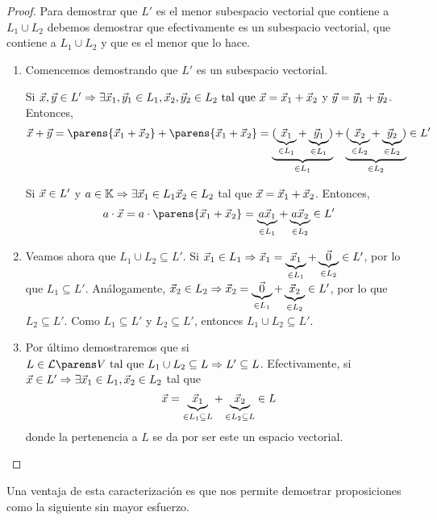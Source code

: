 \documentclass[../algebra_lineal.tex]{subfiles}
\begin{document}
\begin{proof}
    Para demostrar que $L'$ es el menor subespacio vectorial que contiene a $L_1 \cup L_2$ debemos demostrar que efectivamente es un subespacio vectorial, que contiene a $L_1 \cup L_2$ y que es el menor que lo hace.

    \begin{enumerate}
        \item Comencemos demostrando que $L'$ es un subespacio vectorial.

        Si $\vec{x}, \vec{y} \in L' \Rightarrow \exists \vec{x}_1, \vec{y}_1 \in L_1, \vec{x}_2, \vec{y}_2 \in L_2 \mathrm{\,\, tal \,\, que \,\,} \vec{x} = \vec{x}_1 + \vec{x}_2$ y $\vec{y} = \vec{y}_1 + \vec{y}_2$. Entonces,
        \[
            \vx + \vy = \parens{\vx_1 + \vx_2} + \parens{\vx_1 + \vx_2} =  \underbrace{{(\underbrace{\vx_1}_{\in L_1} + \underbrace{\vy_1}_{\in L_1}})}_{\in L_1} + \underbrace{{(\underbrace{\vx_2}_{\in L_2} + \underbrace{\vy_2}_{\in L_2}})}_{\in L_2} \in L'
        \]

        Si $\vec{x} \in L'$ y $a \in \mathbb{K} \Rightarrow \exists \vec{x}_1 \in L_1 \vec{x}_2 \in L_2$ tal que $\vec{x}=\vec{x}_1+\vec{x}_2$. Entonces,
        \[
            a \cdot \vx = a \cdot \parens{\vx_1 + \vx_2} = \underbrace{a \vx_1}_{\in L_1} +  \underbrace{a \vx_2}_{\in L_2} \in L'
        \]

        \item Veamos ahora que $L_1 \cup L_2 \subseteq L'$. Si $\vec{x}_1 \in L_1 \Rightarrow \vec{x}_1 = \underbrace{\vec{x}_1}_{\in L_1} + \underbrace{\vec{0}}_{\in L_2} \in L'$, por lo que $L_1 \subseteq L'$. Análogamente, $\vec{x}_2 \in L_2 \Rightarrow \vec{x}_2 = \underbrace{\vec{0}}_{\in L_1} + \underbrace{\vec{x}_2}_{\in L_2} \in L'$, por lo que $L_2 \subseteq L'$. Como $L_1 \subseteq L'$ y $L_2 \subseteq L'$, entonces $L_1 \cup L_2 \subseteq L'$.
        
        \item Por último demostraremos que si $L \in \subespaciosde{V} \st L_1 \cup L_2 \subseteq L \Rightarrow L' \subseteq L$. Efectivamente, si $\vec{x} \in L' \Rightarrow \exists \vec{x}_1 \in L_1, \vec{x}_2 \in L_2$ tal que
        \[
            \vec{x} = \underbrace{\vec{x}_1}_{\in L_1 \subseteq L} + \underbrace{\vec{x}_2}_{\in L_2 \subseteq L} \in L
        \]
        donde la pertenencia a $L$ se da por ser este un espacio vectorial.
    \end{enumerate}
\end{proof}

Una ventaja de esta caracterización es que nos permite demostrar proposiciones como la siguiente sin mayor esfuerzo.
\end{document}
